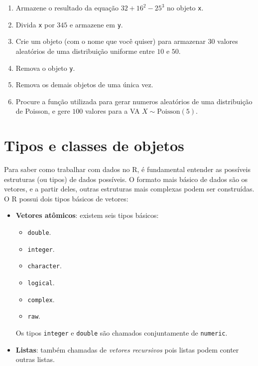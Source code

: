 \documentclass[
  10pt,
  a4paper]{book}
\providecommand{\tightlist}{%
  \setlength{\itemsep}{0pt}\setlength{\parskip}{0pt}}
\begin{document}
\begin{enumerate}
\def\labelenumi{\arabic{enumi}.}
\tightlist
\item
  Armazene o resultado da equação \(32 + 16^2 - 25^3\) no objeto \texttt{x}.
\item
  Divida \texttt{x} por \(345\) e armazene em \texttt{y}.
\item
  Crie um objeto (com o nome que você quiser) para armazenar \(30\)
  valores aleatórios de uma distribuição uniforme entre \(10\) e \(50\).
\item
  Remova o objeto \texttt{y}.
\item
  Remova os demais objetos de uma única vez.
\item
  Procure a função utilizada para gerar numeros aleatórios de uma
  distribuição de Poisson, e gere \(100\) valores para a VA \(X \sim \text{Poisson}(5)\).
\end{enumerate}

\hypertarget{tipos-e-classes-de-objetos}{%
\section{Tipos e classes de objetos}\label{tipos-e-classes-de-objetos}}

Para saber como trabalhar com dados no R, é fundamental entender as
possíveis estruturas (ou tipos) de dados possíveis. O formato mais
básico de dados são os vetores, e a partir deles, outras estruturas mais
complexas podem ser construídas. O R possui dois tipos básicos de
vetores:

\begin{itemize}
\item
  \textbf{Vetores atômicos}: existem seis tipos básicos:

  \begin{itemize}
  \tightlist
  \item
    \texttt{double}.
  \item
    \texttt{integer}.
  \item
    \texttt{character}.
  \item
    \texttt{logical}.
  \item
    \texttt{complex}.
  \item
    \texttt{raw}.
  \end{itemize}

  Os tipos \texttt{integer} e \texttt{double} são chamados conjuntamente de \texttt{numeric}.
\item
  \textbf{Listas}: também chamadas de \emph{vetores recursivos} pois listas podem
  conter outras listas.
\end{itemize}
\end{document}
